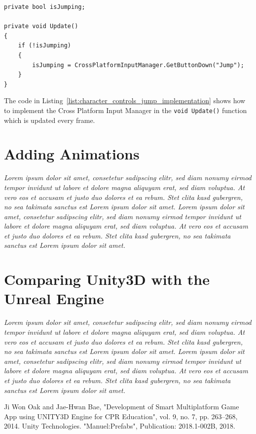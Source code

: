\documentclass[conference]{IEEEtran}
\begin{document}
\begin{lstlisting}[caption=Example Implementation for Determining a Jump,label=list:character_controls_jump_implementation]
private bool isJumping;

private void Update()
{
	if (!isJumping)
	{
		isJumping = CrossPlatformInputManager.GetButtonDown("Jump");
	}
}
\end{lstlisting}

The code in Listing~\ref{list:character_controls_jump_implementation} shows how to implement the Cross Platform Input Manager in the \lstinline!void Update()! function which is updated every frame. 

\section{Adding Animations}

\emph{Lorem ipsum dolor sit amet, consetetur sadipscing elitr, sed diam nonumy eirmod tempor invidunt ut labore et dolore magna aliquyam erat, sed diam voluptua. At vero eos et accusam et justo duo dolores et ea rebum. Stet clita kasd gubergren, no sea takimata sanctus est Lorem ipsum dolor sit amet. Lorem ipsum dolor sit amet, consetetur sadipscing elitr, sed diam nonumy eirmod tempor invidunt ut labore et dolore magna aliquyam erat, sed diam voluptua. At vero eos et accusam et justo duo dolores et ea rebum. Stet clita kasd gubergren, no sea takimata sanctus est Lorem ipsum dolor sit amet.}

\section{Comparing Unity3D with the Unreal Engine}

\emph{Lorem ipsum dolor sit amet, consetetur sadipscing elitr, sed diam nonumy eirmod tempor invidunt ut labore et dolore magna aliquyam erat, sed diam voluptua. At vero eos et accusam et justo duo dolores et ea rebum. Stet clita kasd gubergren, no sea takimata sanctus est Lorem ipsum dolor sit amet. Lorem ipsum dolor sit amet, consetetur sadipscing elitr, sed diam nonumy eirmod tempor invidunt ut labore et dolore magna aliquyam erat, sed diam voluptua. At vero eos et accusam et justo duo dolores et ea rebum. Stet clita kasd gubergren, no sea takimata sanctus est Lorem ipsum dolor sit amet.}


\begin{thebibliography}{00}
 Ji Won Oak and Jae-Hwan Bae, "Development of Smart Multiplatform Game App using UNITY3D Engine for CPR Education", vol. 9, no. 7, pp. 263--268, 2014.
 Unity Technologies. "Manuel:Prefabs", Publication: 2018.1-002B, 2018.
\end{thebibliography}
\end{document}
